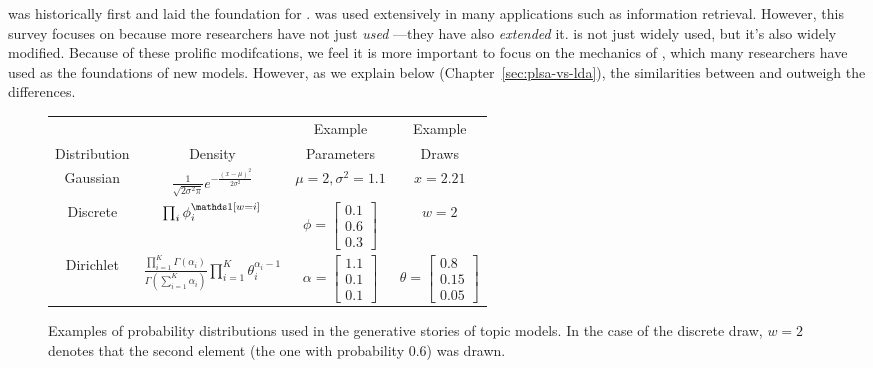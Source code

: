 \plsa{} was historically first and laid the foundation for .
\plsa{} was used extensively in many applications such as information
retrieval.  However, this survey focuses on  because more
researchers have not just \emph{used} ---they have also
\emph{extended} it.   is not just widely used, but it's also
widely modified.  Because of these prolific modifcations, we feel it
is more important to focus on the mechanics of , which many
researchers have used as the foundations of new models.  However, as
we explain below (Chapter~\ref{sec:plsa-vs-lda}), the similarities
between \plsa{} and  outweigh the differences.

\begin{figure}
\small
{}
  \begin{tabular}{cccc}
\hline
\rowcolor{gray!50}
 & & Example & Example \\
\rowcolor{gray!50}
    Distribution & Density & Parameters & Draws \\
    \hline \hline
    Gaussian  & $\frac{1}{\sqrt{2 \sigma^2 \pi}} e^{- \frac{(x-\mu)^2}{2 \sigma^2}}$ & $\mu=2, \sigma^2=1.1$ & $x=2.21$\\
    Discrete  & $\prod_i \phi_i^{\ind{w=i}}$ & $\phi=\begin{bmatrix}
           0.1 \\
           0.6 \\
           0.3 
         \end{bmatrix}$
                                                & $w=2$ \\
   Dirichlet & $\frac{\prod_{i=1}^K \Gamma(\alpha_i)}{\Gamma \left( \sum_{i=1}^K \alpha_i \right)} \prod_{i=1}^K \theta_i^{\alpha_i - 1} $ & $\alpha = \begin{bmatrix}
           1.1 \\
           0.1 \\
           0.1 
         \end{bmatrix}$  & $\theta = \begin{bmatrix}
           0.8 \\
           0.15 \\
           0.05 
         \end{bmatrix}$ \\
     \hline
  \end{tabular}
  \caption{Examples of probability distributions used in the
    generative stories of topic models.  In the case of the discrete
    draw, $w=2$ denotes that the second element (the one with
    probability $0.6$) was drawn.}
  \label{fig:distribution_examples}
\end{figure}

